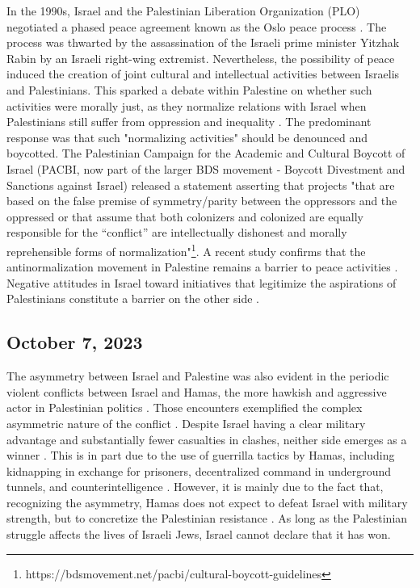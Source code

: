 \documentclass[dissertation,math,vertlayout,pdfa,colorlinks]{aaltoseries}
\begin{document}
In the 1990s, Israel and the Palestinian Liberation Organization (PLO) negotiated a phased peace agreement known as the Oslo peace process \cite{bickertonOsloPeaceProcess2022}. The process was thwarted by the assassination of the Israeli prime minister Yitzhak Rabin by an Israeli right-wing extremist. Nevertheless, the possibility of peace induced the creation of joint cultural and intellectual activities between Israelis and Palestinians. This sparked a debate within Palestine on whether such activities were morally just, as they normalize relations with Israel when Palestinians still suffer from oppression and inequality \cite{miariAttitudesPalestiniansNormalization1999}. The predominant response was that such "normalizing activities" should be denounced and boycotted. The Palestinian Campaign for the Academic and Cultural Boycott of Israel (PACBI, now part of the larger BDS movement - Boycott Divestment and Sanctions against Israel) released a statement asserting that projects "that are based on the false premise of symmetry/parity between the oppressors and the oppressed or that assume that both colonizers and colonized are equally responsible for the “conflict” are intellectually dishonest and morally reprehensible forms of normalization"\footnote{https://bdsmovement.net/pacbi/cultural-boycott-guidelines}. A recent study confirms that the antinormalization movement in Palestine remains a barrier to peace activities \cite{hassounaSpacesDialogueSegregated2016}. Negative attitudes in Israel toward initiatives that legitimize the aspirations of Palestinians constitute a barrier on the other side \cite{hassounaSpacesDialogueSegregated2016}.

\subsection{October 7, 2023}
The asymmetry between Israel and Palestine was also evident in the periodic violent conflicts between Israel and Hamas, the more hawkish and aggressive actor in Palestinian politics \cite{pearlmanPalestinianNationalism2022}. Those encounters exemplified the complex asymmetric nature of the conflict \cite{rossBarriersAgreementAsymmetric2014}. Despite Israel having a clear military advantage and substantially fewer casualties in clashes, neither side emerges as a winner \cite{hitmanWinnerDoesNot2023}. This is in part due to the use of guerrilla tactics by Hamas, including kidnapping in exchange for prisoners, decentralized command in underground tunnels, and counterintelligence \cite{flamerAsymmetricBattleWits2025}. However, it is mainly due to the fact that, recognizing the asymmetry, Hamas does not expect to defeat Israel with military strength, but to concretize the Palestinian resistance \cite{hitmanWinnerDoesNot2023}. As long as the Palestinian struggle affects the lives of Israeli Jews, Israel cannot declare that it has won.
\end{document}
